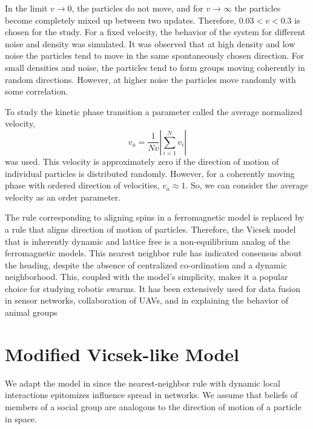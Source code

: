 \documentclass[letterpaper,english,11pt]{article}
\begin{document}
In the limit $v\rightarrow 0$, the particles do not move, and for $v\rightarrow \infty$ the particles become completely mixed up between two updates. Therefore, $0.03<v<0.3$ is chosen for the study. For a fixed velocity, the behavior of the system for different noise and density was simulated. It was observed that at high density and low noise the particles tend to move in the same spontaneously chosen direction. For small densities and noise, the particles tend to form groups moving coherently in random directions. However, at higher noise the particles move randomly with some correlation. 

To study the kinetic phase transition a parameter called the average normalized velocity, 
\begin{equation}
v_{a} = \frac{1}{Nv}|\sum_{i=1}^{N}v_{i}|
\end{equation} was used. This velocity is approximately zero if the direction of motion of individual particles is distributed randomly. However, for a coherently moving phase with ordered direction of velocities, $v_{a}\approx 1$. So, we can consider the average velocity as an order parameter. 

The rule corresponding to aligning spins in a ferromagnetic model is replaced by a rule that aligns direction of motion of particles. Therefore, the Vicsek model that is inherently dynamic and lattice free is a non-equilibrium analog of the ferromagnetic models. This nearest neighbor rule has indicated consensus about the heading, despite the absence of centralized co-ordination and a dynamic neighborhood. This, coupled with the model's simplicity, makes it a popular choice for studying robotic swarms. It has been extensively used for data fusion in sensor networks, collaboration of UAVs, and in explaining the behavior of animal groups
\section{Modified Vicsek-like Model}
We adapt the model in \cite{vicsek1995novel} since the nearest-neighbor rule with dynamic local interactions epitomizes influence spread in networks. We assume that beliefs of members of a social group are analogous to the direction of motion of a particle in space.
\end{document}
